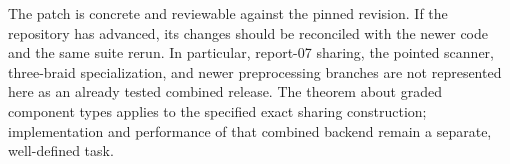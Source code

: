 The patch is concrete and reviewable against the pinned revision. If the
repository has advanced, its changes should be reconciled with the newer
code and the same suite rerun. In particular, report-07 sharing, the
pointed scanner, three-braid specialization, and newer preprocessing
branches are not represented here as an already tested combined release.
The theorem about graded component types applies to the specified exact
sharing construction; implementation and performance of that combined
backend remain a separate, well-defined task.

